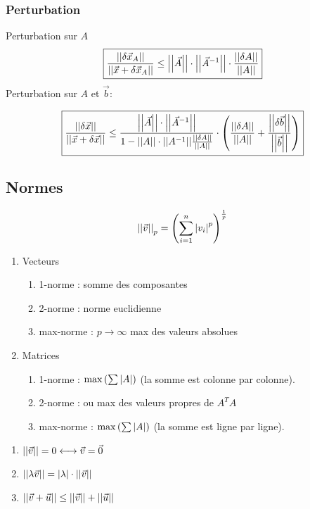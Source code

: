 \documentclass[resume]{subfiles}
\begin{document}
	\subsubsection{Perturbation}
	Perturbation sur $A$
	$$\boxed{\frac{\abs{\abs{\delta\vec{x}_A}}}{\abs{\abs{\vec{x}+\delta \vec{x}_A}}}\leq \abs{\abs{\vec{A}}}\cdot\abs{\abs{\vec{A}^{-1}}}\cdot\frac{\abs{\abs{\delta A}}}{\abs{\abs{A}}}}$$
	Perturbation sur $A$ et $\vec{b}$:
	\begin{small}
	$$\boxed{\frac{\abs{\abs{\delta\vec{x}}}}{\abs{\abs{\vec{x}+\delta \vec{x}}}}\leq \frac{\abs{\abs{\vec{A}}}\cdot\abs{\abs{\vec{A}^{-1}}}}{1-\abs{\abs{A}}\cdot \abs{\abs{A^{-1}}}\frac{\abs{\abs{\delta A}}}{\abs{\abs{A}}}}\cdot\left(\frac{\abs{\abs{\delta A}}}{\abs{\abs{A}}}+\frac{\abs{\abs{\delta \vec{b}}}}{\abs{\abs{\vec{b}}}}\right)}$$
	\end{small}
	\subsection{Normes}
	$$\abs{\abs{\vec{v}}}_p=\left(\sum_{i=1}^{n}\abs{v_i}^p\right)^{\frac{1}{p}}$$
	\begin{enumerate}
	\item Vecteurs
		\begin{enumerate}
	\item 1-norme : somme des composantes
	\item 2-norme : norme euclidienne
	\item max-norme : $p\to\infty$ max des valeurs absolues
	\end{enumerate}
	\item Matrices
	\begin{enumerate}
	\item 1-norme : $\max\left(\sum\abs{A}\right)$ (la somme est colonne par colonne).
	\item 2-norme : ou max des valeurs propres de $A^{T}A$
	\item max-norme : $\max\left(\sum\abs{A}\right)$ (la somme est ligne par ligne).
	\end{enumerate}
	\end{enumerate}

	\begin{enumerate}
	\item $\abs{\abs{\vec{v}}}=0\longleftrightarrow \vec{v}=\vec{0}$
	\item $\abs{\abs{\lambda\vec{v}}}=\abs{\lambda}\cdot \abs{\abs{\vec{v}}}$
	\item $\abs{\abs{\vec{v}+\vec{u}}}\leq \abs{\abs{\vec{v}}}+\abs{\abs{\vec{u}}}$
	\end{enumerate}
\end{document}
